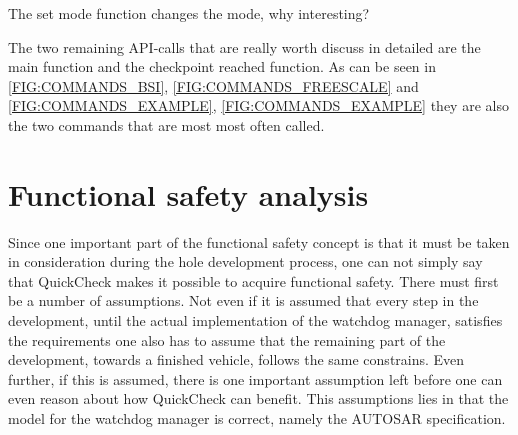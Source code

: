 The set mode function changes the mode, why interesting? 

The two remaining API-calls that are really worth discuss in detailed are the
main function and the checkpoint reached function. As can be seen in   
\ref{FIG:COMMANDS_BSI}, \ref{FIG:COMMANDS_FREESCALE} and \ref{FIG:COMMANDS_EXAMPLE},
\ref{FIG:COMMANDS_EXAMPLE} they are also the two commands that are most most
often called. 

\section{Functional safety analysis}
Since one important part of the functional safety concept is that it must be
taken in consideration during the hole development process, one can not simply
say that QuickCheck makes it possible to acquire functional safety. There must
first be a number of assumptions. Not even if it is assumed that
every step in the development, until the actual implementation of the watchdog
manager, satisfies the requirements one also has to assume that the remaining
part of the development, towards a finished vehicle, follows the same
constrains. Even further, if this is assumed, there is one important
assumption left before
one can even reason about how QuickCheck can benefit.
This assumptions lies in that the model for the watchdog
manager is correct, namely the AUTOSAR specification.
